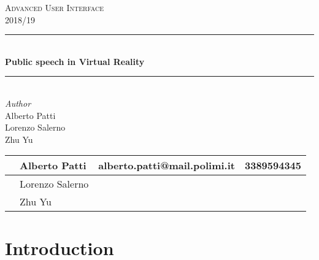 \documentclass[letterpaper,12pt]{article}
\begin{document}
\begin{titlepage} %
	\newcommand{\HRule}{\rule{\linewidth}{0.5mm}} %
	
	\center %
	
	
	\textsc{\LARGE Advanced User Interface}\\[0.5cm] %
	
	\textsc{\Large 2018/19}\\[0.5cm] %
	
	
	\HRule\\[0.4cm]
	
	{\huge\bfseries Public speech in Virtual Reality}\\[0.4cm] %
	
	\HRule\\[1cm]
	
	
	\large\textit{Author}\\[0.3cm]
	Alberto Patti\\
	Lorenzo Salerno\\
	Zhu Yu\\[1.5cm]
	

	\begin{abstract}
	\end{abstract}
	\begin{table}[h]
		\centering
		\begin{tabular}{|l|l|l|l|}
			\hline
 			& Alberto Patti & alberto.patti@mail.polimi.it & 3389594345\\ \hline
 			& Lorenzo Salerno & & \\ \hline
 			& Zhu Yu & & \\ \hline
		\end{tabular}
	\end{table}
\end{titlepage}

\tableofcontents
\pagebreak
\section{Introduction}
	
	\pagebreak
\end{document}
